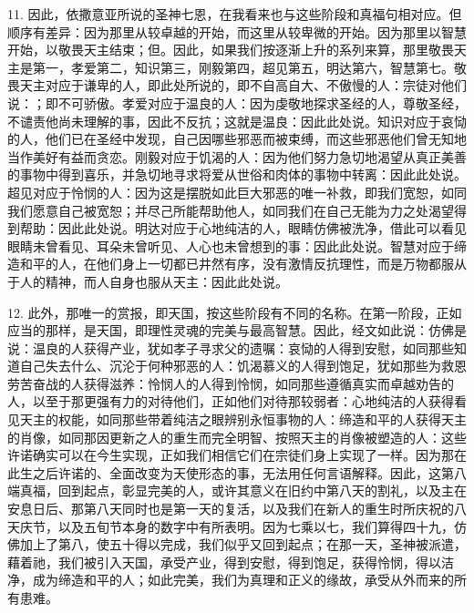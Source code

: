11. 因此，依撒意亚所说的圣神七恩，在我看来也与这些阶段和真福句相对应。但顺序有差异：因为那里从较卓越的开始，而这里从较卑微的开始。因为那里以智慧开始，以敬畏天主结束；但。因此，如果我们按逐渐上升的系列来算，那里敬畏天主是第一，孝爱第二，知识第三，刚毅第四，超见第五，明达第六，智慧第七。敬畏天主对应于谦卑的人，即此处所说的，即不自高自大、不傲慢的人：宗徒对他们说：；即不可骄傲。孝爱对应于温良的人：因为虔敬地探求圣经的人，尊敬圣经，不谴责他尚未理解的事，因此不反抗；这就是温良：因此此处说。知识对应于哀恸的人，他们已在圣经中发现，自己因哪些邪恶而被束缚，而这些邪恶他们曾无知地当作美好有益而贪恋。刚毅对应于饥渴的人：因为他们努力急切地渴望从真正美善的事物中得到喜乐，并急切地寻求将爱从世俗和肉体的事物中转离：因此此处说。超见对应于怜悯的人：因为这是摆脱如此巨大邪恶的唯一补救，即我们宽恕，如同我们愿意自己被宽恕；并尽己所能帮助他人，如同我们在自己无能为力之处渴望得到帮助：因此此处说。明达对应于心地纯洁的人，眼睛仿佛被洗净，借此可以看见眼睛未曾看见、耳朵未曾听见、人心也未曾想到的事：因此此处说。智慧对应于缔造和平的人，在他们身上一切都已井然有序，没有激情反抗理性，而是万物都服从于人的精神，而人自身也服从天主：因此此处说。\par

12. 此外，那唯一的赏报，即天国，按这些阶段有不同的名称。在第一阶段，正如应当的那样，是天国，即理性灵魂的完美与最高智慧。因此，经文如此说：仿佛是说：温良的人获得产业，犹如孝子寻求父的遗嘱：哀恸的人得到安慰，如同那些知道自己失去什么、沉沦于何种邪恶的人：饥渴慕义的人得到饱足，犹如那些为救恩劳苦奋战的人获得滋养：怜悯人的人得到怜悯，如同那些遵循真实而卓越劝告的人，以至于那更强有力的对待他们，正如他们对待那较弱者：心地纯洁的人获得看见天主的权能，如同那些带着纯洁之眼辨别永恒事物的人：缔造和平的人获得天主的肖像，如同那因更新之人的重生而完全明智、按照天主的肖像被塑造的人：这些许诺确实可以在今生实现，正如我们相信它们在宗徒们身上实现了一样。因为那在此生之后许诺的、全面改变为天使形态的事，无法用任何言语解释。因此，这第八端真福，回到起点，彰显完美的人，或许其意义在旧约中第八天的割礼，以及主在安息日后、那第八天同时也是第一天的复活，以及我们在新人的重生时所庆祝的八天庆节，以及五旬节本身的数字中有所表明。因为七乘以七，我们算得四十九，仿佛加上了第八，使五十得以完成，我们似乎又回到起点；在那一天，圣神被派遣，藉着祂，我们被引入天国，承受产业，得到安慰，得到饱足，获得怜悯，得以洁净，成为缔造和平的人；如此完美，我们为真理和正义的缘故，承受从外而来的所有患难。\par

